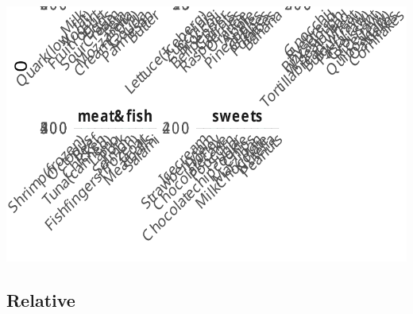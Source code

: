 \documentclass[
  letterpaper,
  DIV=11,
  numbers=noendperiod]{scrartcl}
\begin{document}
\includegraphics{items_files/figure-pdf/unnamed-chunk-8-1.pdf}

\subsection{Relative}
\end{document}
